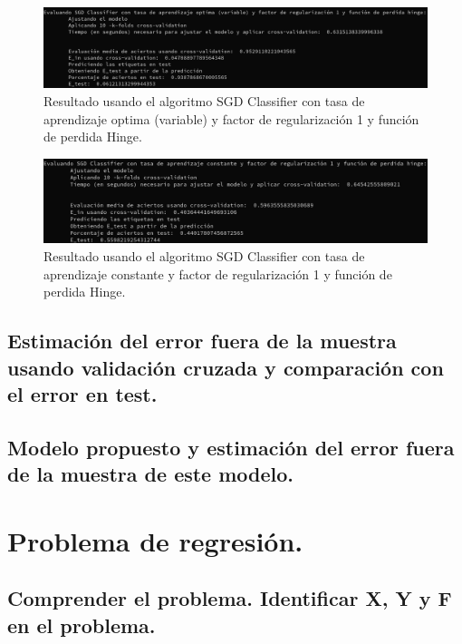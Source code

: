 \documentclass[12pt, spanish]{article}
\begin{document}
\begin{figure}[H]
	\centering
	\hspace*{-1cm}\includegraphics[scale=0.4]{clasificacion/sgdH1.png}
	\caption{Resultado usando el algoritmo SGD Classifier con tasa de aprendizaje optima (variable) y factor de regularización 1 y función de perdida Hinge.}
	\label{SGDL001}
\end{figure}

\begin{figure}[H]
	\centering
	\hspace*{-1cm}\includegraphics[scale=0.4]{clasificacion/sgdH1c.png}
	\caption{Resultado usando el algoritmo SGD Classifier con tasa de aprendizaje constante y factor de regularización 1 y función de perdida Hinge.}
	\label{SGDL001}
\end{figure}

\newpage

\subsection{Estimación del error fuera de la muestra usando validación cruzada y comparación con el error en test.}

\subsection{Modelo propuesto y estimación del error fuera de la muestra de este modelo.}






\newpage

\section{Problema de regresión.}

\subsection{Comprender el problema. Identificar X, Y y F en el problema.}
\end{document}

